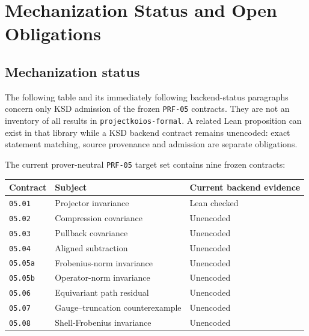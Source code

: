 \chapter{Mechanization Status and Open Obligations}

\label{ch:mechanization-status}



\section{Mechanization status}


The following table and its immediately following backend-status paragraphs
concern only KSD admission of the frozen \texttt{PRF-05} contracts. They are
not an inventory of all results in \texttt{projectkoios-formal}. A related
Lean proposition can exist in that library while a KSD backend contract
remains unencoded: exact statement matching, source provenance and admission
are separate obligations.

The current prover-neutral \texttt{PRF-05} target set contains nine frozen
contracts:

\begin{center}
\small
\begin{tabular}{@{}lll@{}}
\toprule
Contract & Subject & Current backend evidence \\
\midrule
\texttt{05.01} & Projector invariance & Lean checked \\
\texttt{05.02} & Compression covariance & Unencoded \\
\texttt{05.03} & Pullback covariance & Unencoded \\
\texttt{05.04} & Aligned subtraction & Unencoded \\
\texttt{05.05a} & Frobenius-norm invariance & Unencoded \\
\texttt{05.05b} & Operator-norm invariance & Unencoded \\
\texttt{05.06} & Equivariant path residual & Unencoded \\
\texttt{05.07} & Gauge--truncation counterexample & Unencoded \\
\texttt{05.08} & Shell-Frobenius invariance & Unencoded \\
\bottomrule
\end{tabular}
\end{center}

